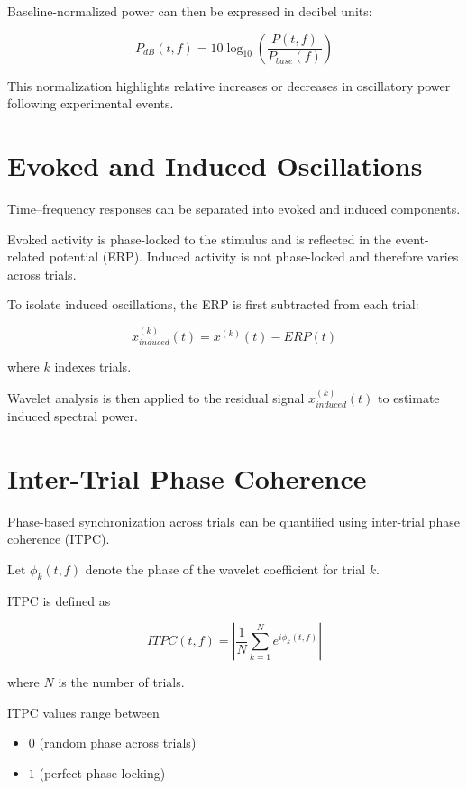 \documentclass[11pt]{report}
\begin{document}
Baseline-normalized power can then be expressed in decibel units:

\begin{equation}
P_{dB}(t,f) =
10\log_{10}
\left(
\frac{P(t,f)}{P_{base}(f)}
\right)
\end{equation}

This normalization highlights relative increases or decreases
in oscillatory power following experimental events.

\section{Evoked and Induced Oscillations}

Time--frequency responses can be separated into evoked and induced
components.

Evoked activity is phase-locked to the stimulus and is reflected
in the event-related potential (ERP). Induced activity is not
phase-locked and therefore varies across trials.

To isolate induced oscillations, the ERP is first subtracted from
each trial:

\begin{equation}
x_{induced}^{(k)}(t) =
x^{(k)}(t) - ERP(t)
\end{equation}

where $k$ indexes trials.

Wavelet analysis is then applied to the residual signal
$x_{induced}^{(k)}(t)$ to estimate induced spectral power.

\section{Inter-Trial Phase Coherence}

Phase-based synchronization across trials can be quantified using
inter-trial phase coherence (ITPC).

Let $\phi_k(t,f)$ denote the phase of the wavelet coefficient for
trial $k$.

ITPC is defined as

\begin{equation}
ITPC(t,f) =
\left|
\frac{1}{N}
\sum_{k=1}^{N}
e^{i\phi_k(t,f)}
\right|
\end{equation}

where $N$ is the number of trials.

ITPC values range between

\begin{itemize}
\item $0$ (random phase across trials)
\item $1$ (perfect phase locking)
\end{itemize}
\end{document}
